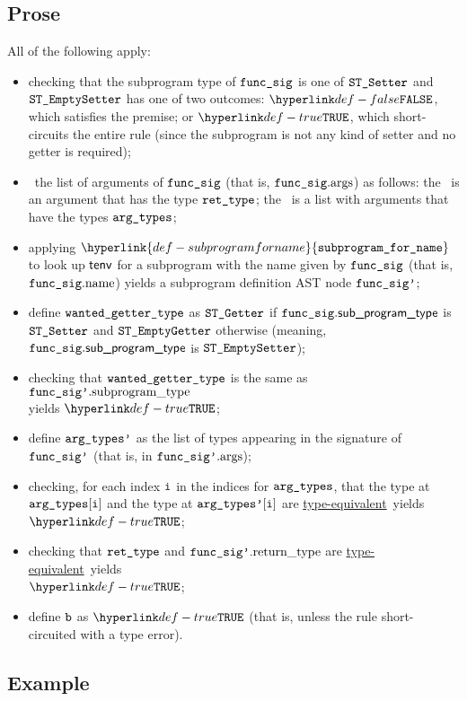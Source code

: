 \documentclass{book}
\newcommand\ProseOrTypeError[0]{\ProseTerminateAs{\TypeErrorConfig}}
\newcommand\typeequivalent[0]{\hyperlink{def-typeequal}{type-equivalent}}
\newcommand\subprogramforname[0]{\hyperlink{def-subprogramforname}{\texttt{subprogram\_for\_name}}}
\begin{document}
\subsection{Prose}
All of the following apply:
\begin{itemize}
  \item checking that the subprogram type of $\texttt{func\_sig}$ is one of $\texttt{ST\_Setter}$ and \\ $\texttt{ST\_EmptySetter}$
        has one of two outcomes:
        $\False$, which satisfies the premise;
        or $\True$, which short-circuits the entire rule
        (since the subprogram is not any kind of setter and no getter is required);
  \item \view\ the list of arguments of $\texttt{func\_sig}$ (that is, $\texttt{func\_sig}.\text{args}$) as follows:
        the \head\ is an argument that has the type $\texttt{ret\_type}$;
        the \tail\ is a list with arguments that have the types $\texttt{arg\_types}$;
  \item applying $\subprogramforname$ to look up $\textsf{tenv}$ for a subprogram with the name given by $\texttt{func\_sig}$ (that is, $\texttt{func\_sig}.\text{name}$)
        yields a subprogram definition AST node $\texttt{func\_sig'}$\ProseOrTypeError;
  \item define $\texttt{wanted\_getter\_type}$ as $\texttt{ST\_Getter}$ if $\texttt{func\_sig}.\textsf{sub\_program\_type}$ is \\ $\texttt{ST\_Setter}$ and
        $\texttt{ST\_EmptyGetter}$ otherwise (meaning, $\texttt{func\_sig}.\textsf{sub\_program\_type}$ is $\texttt{ST\_EmptySetter}$);
  \item checking that $\texttt{wanted\_getter\_type}$ is the same as $\texttt{func\_sig'}.\text{subprogram\_type}$ \\ yields $\True$\ProseOrTypeError;
  \item define $\texttt{arg\_types'}$ as the list of types appearing in the signature of $\texttt{func\_sig'}$ (that is, in $\texttt{func\_sig'}.\text{args}$);
  \item checking, for each index $\texttt{i}$ in the indices for $\texttt{arg\_types}$, that the type at $\texttt{arg\_types}[\texttt{i}]$ and the type at $\texttt{arg\_types'}[\texttt{i}]$
        are \typeequivalent\ yields $\True$\ProseOrTypeError;
  \item checking that $\texttt{ret\_type}$ and $\texttt{func\_sig'}.\text{return\_type}$ are \typeequivalent\ yields \\
        $\True$\ProseOrTypeError;
  \item define $\texttt{b}$ as $\True$ (that is, unless the rule short-circuited with a type error).
\end{itemize}

\subsection{Example}
\end{document}
